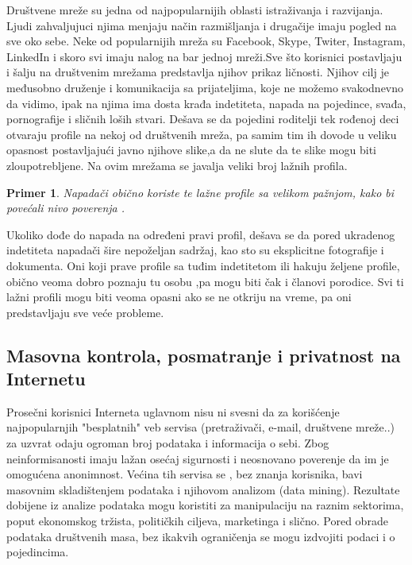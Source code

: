 \documentclass[a4paper]{article}
\newtheorem{primer}{Primer}[section]
\begin{document}
Društvene mreže su jedna od najpopularnijih oblasti istraživanja i razvijanja. Ljudi zahvaljujuci njima menjaju način razmišljanja i drugačije imaju pogled na sve oko sebe. Neke od popularnijih mreža su Facebook, Skype, Twiter, Instagram, LinkedIn i skoro svi imaju nalog na bar jednoj mreži.Sve što korisnici postavljaju i šalju na društvenim mrežama predstavlja njihov prikaz ličnosti. Njihov cilj je međusobno druženje i komunikacija sa prijateljima, koje ne možemo svakodnevno da vidimo, ipak na njima ima dosta krađa indetiteta, napada na pojedince, svađa, pornografije i sličnih loših stvari. Dešava se da pojedini roditelji tek rođenoj deci otvaraju profile na nekoj od društvenih mreža, pa samim tim ih dovode u veliku opasnost postavljajući javno njihove slike,a da ne slute da te slike mogu biti zloupotrebljene. Na ovim mrežama se javalja veliki broj lažnih profila.
\begin{primer}
Napadači obično koriste te lažne profile sa velikom pažnjom, kako bi povećali nivo poverenja \cite{fakePr} . 
\end{primer}
Ukoliko dođe do napada na određeni pravi profil, dešava se da pored ukradenog indetiteta  napadači šire nepoželjan sadržaj, kao sto su eksplicitne fotografije i dokumenta. Oni koji prave profile sa tuđim indetitetom ili hakuju željene profile, obično veoma dobro poznaju tu osobu ,pa  mogu biti čak i članovi porodice. Svi ti lažni profili mogu biti veoma opasni ako se ne otkriju na vreme, pa oni predstavljaju sve veće probleme.

\subsection{Masovna kontrola, posmatranje i privatnost na Internetu}
\label{subsec:podnaslovIP4}

\indent\indent Prosečni korisnici Interneta uglavnom nisu ni svesni da za korišćenje najpopularnjih "besplatnih" veb servisa (pretraživači, e-mail, društvene mreže..) za uzvrat odaju ogroman broj podataka i informacija o sebi. Zbog neinformisanosti imaju lažan osećaj sigurnosti i neosnovano poverenje da im je omogućena anonimnost. Većina tih servisa se , bez znanja korisnika,  bavi masovnim skladištenjem podataka i njihovom analizom (data mining). Rezultate dobijene iz analize podataka mogu koristiti za manipulaciju na raznim sektorima, poput ekonomskog tržista, političkih ciljeva, marketinga i slično. Pored obrade podataka društvenih masa, bez ikakvih ograničenja se mogu izdvojiti podaci i o pojedincima.
		
\end{document}
